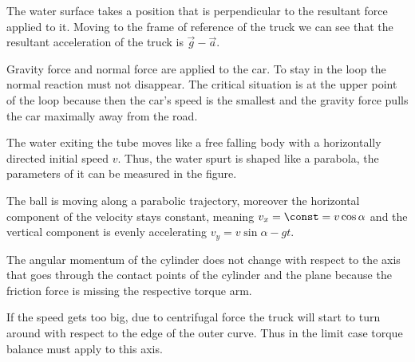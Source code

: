 \documentclass[11pt]{article}
\begin{document}
\hinteng
The water surface takes a position that is perpendicular to the resultant force applied to it. Moving to the frame of reference of the truck we can see that the resultant acceleration of the truck is $\vec g - \vec a$.
\probend
\bigskip


\hinteng
Gravity force and normal force are applied to the car. To stay in the loop the normal reaction must not disappear. The critical situation is at the upper point of the loop because then the car’s speed is the smallest and the gravity force pulls the car maximally away from the road.
\probend
\bigskip


\hinteng
The water exiting the tube moves like a free falling body with a horizontally directed initial speed $v$. Thus, the water spurt is shaped like a parabola, the parameters of it can be measured in the figure.
\probend
\bigskip


\hinteng
The ball is moving along a parabolic trajectory, moreover the horizontal component of the velocity stays constant, meaning $v_x = \const = v\cos\alpha$ and the vertical component is evenly accelerating $v_y = v\sin\alpha - gt$.
\probend
\bigskip


\hinteng
The angular momentum of the cylinder does not change with respect to the axis that goes through the contact points of the cylinder and the plane because the friction force is missing the respective torque arm.
\probend
\bigskip


\hinteng
If the speed gets too big, due to centrifugal force the truck will start to turn around with respect to the edge of the outer curve. Thus in the limit case torque balance must apply to this axis.
\probend
\bigskip
\end{document}
